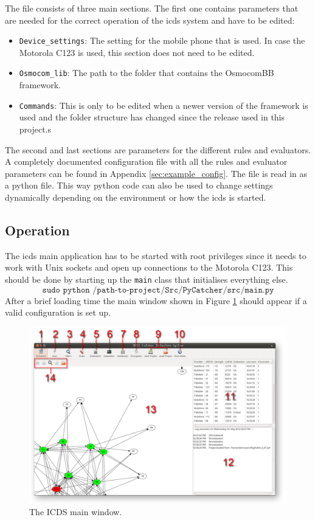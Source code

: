 The file consists of three main sections.
The first one contains parameters that are needed for the correct operation of the \gls{icds} system and have to be edited:
\begin{itemize}
	\item \texttt{Device\_settings}: The setting for the mobile phone that is used.
	In case the Motorola C123 is used, this section does not need to be edited.
	\item \texttt{Osmocom\_lib}: The path to the folder that contains the OsmocomBB framework.
	\item \texttt{Commands}: This is only to be edited when a newer version of the framework is used and the folder structure has changed since the release used in this project.s
\end{itemize}
The second and last sections are parameters for the different rules and evaluators.
A completely documented configuration file with all the rules and evaluator parameters can be found in Appendix \ref{sec:example_config}.
The file is read in as a python file.
This way python code can also be used to change settings dynamically depending on the environment or how the \gls{icds} is started.

\subsection{Operation}
\label{sec:icds_operation}
The \gls{icds} main application has to be started with root privileges since it needs to work with Unix sockets and open up connections to the Motorola C123.
This should be done by starting up the \texttt{main} class that initialises everything else.
\[\texttt{sudo python /path-to-project/Src/PyCatcher/src/main.py}\]
After a brief loading time the main window shown in Figure \ref{fig:icds} should appear if a valid configuration is set up.

\begin{figure}
\centering
\includegraphics[width=\textwidth]{../Images/ICDS}
\caption{The ICDS main window.}
\label{fig:icds}
\end{figure}

